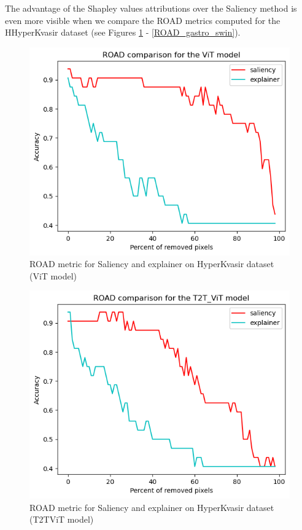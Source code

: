 \documentclass[magisterska,en]{pracamgr}
\begin{document}
The advantage of the Shapley values attributions over the Saliency method is even more visible when we compare the ROAD metrics computed for the HHyperKvasir dataset (see Figures \ref{ROAD_gastro_vit} - \ref{ROAD_gastro_swin}).


\begin{figure}[H]
\centering
\includegraphics[scale=0.6]{./images/ROAD_gastro_vit.png}
\caption{ROAD metric for Saliency and explainer on HyperKvasir dataset (ViT model)}
\label{ROAD_gastro_vit}
\end{figure}


\begin{figure}[H]
\centering
\includegraphics[scale=0.6]{./images/ROAD_gastro_t2t_vit.png}
\caption{ROAD metric for Saliency and explainer on HyperKvasir dataset (T2T\textunderscore ViT model)}
\label{ROAD_gastro_t2t_vit}
\end{figure}
\end{document}
